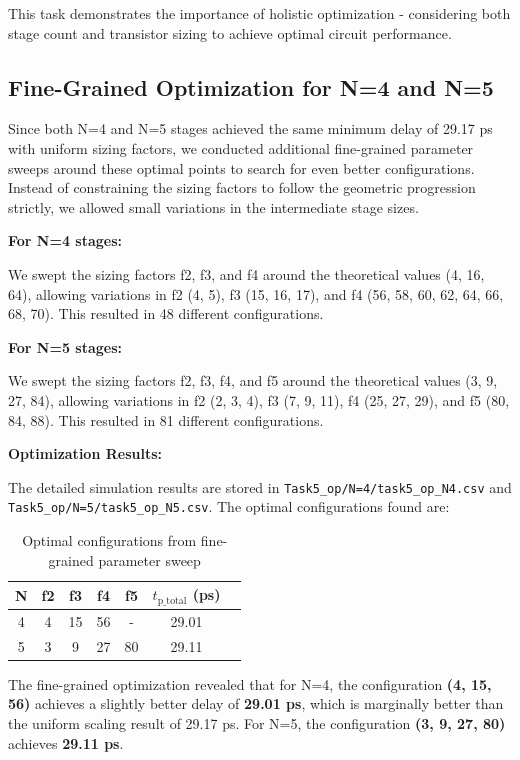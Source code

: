 \documentclass[UTF8,12pt,a4paper]{ctexart}
\begin{document}
This task demonstrates the importance of holistic optimization - considering both stage count and transistor sizing to achieve optimal circuit performance.

\subsection{Fine-Grained Optimization for N=4 and N=5}

Since both N=4 and N=5 stages achieved the same minimum delay of 29.17 ps with uniform sizing factors, we conducted additional fine-grained parameter sweeps around these optimal points to search for even better configurations. Instead of constraining the sizing factors to follow the geometric progression strictly, we allowed small variations in the intermediate stage sizes.

\textbf{For N=4 stages:}

We swept the sizing factors f2, f3, and f4 around the theoretical values (4, 16, 64), allowing variations in f2 (4, 5), f3 (15, 16, 17), and f4 (56, 58, 60, 62, 64, 66, 68, 70). This resulted in 48 different configurations.

\textbf{For N=5 stages:}

We swept the sizing factors f2, f3, f4, and f5 around the theoretical values (3, 9, 27, 84), allowing variations in f2 (2, 3, 4), f3 (7, 9, 11), f4 (25, 27, 29), and f5 (80, 84, 88). This resulted in 81 different configurations.

\textbf{Optimization Results:}

The detailed simulation results are stored in \texttt{Task5\_op/N=4/task5\_op\_N4.csv} and \texttt{Task5\_op/N=5/task5\_op\_N5.csv}. The optimal configurations found are:

\begin{table}[h]
\centering
\begin{tabular}{ccccccc}
\toprule
\textbf{N} & \textbf{f2} & \textbf{f3} & \textbf{f4} & \textbf{f5} & \textbf{$t_{\text{p\_total}}$ (ps)} \\
\midrule
4 & 4 & 15 & 56 & - & 29.01 \\
5 & 3 & 9 & 27 & 80 & 29.11 \\
\bottomrule
\end{tabular}
\caption{Optimal configurations from fine-grained parameter sweep}
\end{table}

The fine-grained optimization revealed that for N=4, the configuration \textbf{(4, 15, 56)} achieves a slightly better delay of \textbf{29.01 ps}, which is marginally better than the uniform scaling result of 29.17 ps. For N=5, the configuration \textbf{(3, 9, 27, 80)} achieves \textbf{29.11 ps}.
\end{document}
